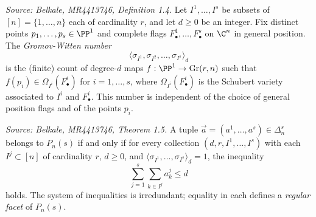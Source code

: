 \begin{definition}[GromovWittenNumber]
  \label{def:gromov-witten-number}
  \uses{}
  \textit{Source: Belkale, MR4413746, Definition 1.4.}
  Let \(I^1, \ldots, I^s\) be subsets of \([n] = \{1, \ldots, n\}\) each of cardinality \(r\), and let \(d \geq 0\) be an integer. Fix distinct points \(p_1, \ldots, p_s \in \PP^1\) and complete flags \(F^1_\bullet, \ldots, F^s_\bullet\) on \(\C^n\) in general position. The \emph{Gromov-Witten number}
  \[
    \langle \sigma_{I^1}, \sigma_{I^2}, \ldots, \sigma_{I^s} \rangle_d
  \]
  is the (finite) count of degree-\(d\) maps \(f: \PP^1 \to \mathrm{Gr}(r, n)\) such that \(f(p_i) \in \Omega_{I^i}(F^i_\bullet)\) for \(i = 1, \ldots, s\), where \(\Omega_{I^i}(F^i_\bullet)\) is the Schubert variety associated to \(I^i\) and \(F^i_\bullet\). This number is independent of the choice of general position flags and of the points \(p_i\).
\end{definition}

\begin{theorem}[ABW]
  \label{thm:abw}
  \textit{Source: Belkale, MR4413746, Theorem 1.5.}
  A tuple \(\vec{a} = (a^1, \ldots, a^s) \in \Delta_n^s\) belongs to \(P_n(s)\) if and only if for every collection \((d, r, I^1, \ldots, I^s)\) with each \(I^j \subset [n]\) of cardinality \(r\), \(d \geq 0\), and \(\langle \sigma_{I^1}, \ldots, \sigma_{I^s} \rangle_d = 1\), the inequality
  \[
    \sum_{j=1}^s \sum_{k \in I^j} a_k^j \leq d
  \]
  holds. The system of inequalities is irredundant; equality in each defines a \emph{regular facet} of \(P_n(s)\).
\end{theorem}

